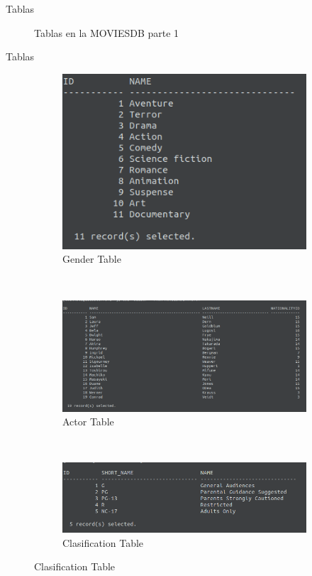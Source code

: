 \documentclass{beamer}%
\begin{document}
\begin{frame}{Tablas}
\begin{figure}
\begin{subfigure}[b]{0.3\textwidth}
    \end{subfigure}
    \caption{Tablas en la MOVIESDB parte 1}
\end{figure}
\end{frame}

\begin{frame}{Tablas}
\begin{figure}
    \centering
    \begin{subfigure}[b]{0.3\textwidth}
        \includegraphics[scale=0.2]{figures/screenshot_gender_data.png}
        \caption{Gender Table}

    \end{subfigure}
    ~ %
    \begin{subfigure}[b]{0.4\textwidth}
        \includegraphics[scale=0.2]{figures/screenshot_actor_data.png}
        \caption{Actor Table}

    \end{subfigure}
    ~ %
    \begin{subfigure}[b]{0.3\textwidth}
        \includegraphics[scale=0.2]{figures/screenshot_clasification_data.png}
        \caption{Clasification Table}


\end{subfigure}
\end{figure}
\end{frame}
\end{document}
